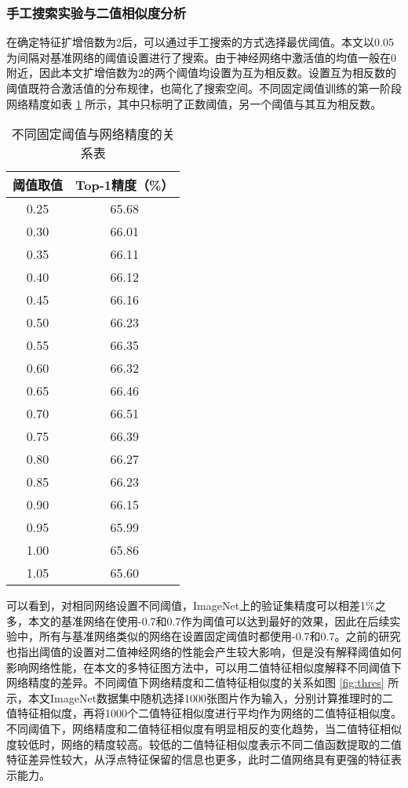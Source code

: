 \subsubsection{手工搜索实验与二值相似度分析}

在确定特征扩增倍数为2后，可以通过手工搜索的方式选择最优阈值。本文以0.05为间隔对基准网络的阈值设置进行了搜索。由于神经网络中激活值的均值一般在0附近，因此本文扩增倍数为2的两个阈值均设置为互为相反数。设置互为相反数的阈值既符合激活值的分布规律，也简化了搜索空间。不同固定阈值训练的第一阶段网络精度如表 \ref{tab:4} 所示，其中只标明了正数阈值，另一个阈值与其互为相反数。

\begin{table}[htb]
  \vspace{6pt}
  \centering
  \caption{不同固定阈值与网络精度的关系表}
  \label{tab:4}
  \begin{tabular}{cc}
    \toprule
    阈值取值   & Top-1精度（\%）    \\
    \midrule
    0.25 & 65.68 \\
    0.30 & 66.01 \\
    0.35 & 66.11 \\
    0.40 & 66.12 \\
    0.45 & 66.16 \\
    0.50 & 66.23 \\
    0.55 & 66.35 \\
    0.60 & 66.32 \\
    0.65 & 66.46 \\
    0.70 & 66.51 \\
    0.75 & 66.39 \\
    0.80 & 66.27 \\
    0.85 & 66.23 \\
    0.90 & 66.15 \\
    0.95 & 65.99 \\
    1.00 & 65.86 \\
    1.05 & 65.60 \\
    \bottomrule
  \end{tabular}
  \vspace{6pt}
\end{table}

可以看到，对相同网络设置不同阈值，ImageNet上的验证集精度可以相差1\%之多，本文的基准网络在使用-0.7和0.7作为阈值可以达到最好的效果，因此在后续实验中，所有与基准网络类似的网络在设置固定阈值时都使用-0.7和0.7。之前的研究\cite{unbalance}也指出阈值的设置对二值神经网络的性能会产生较大影响，但是没有解释阈值如何影响网络性能，在本文的多特征图方法中，可以用二值特征相似度解释不同阈值下网络精度的差异。不同阈值下网络精度和二值特征相似度的关系如图 \ref{fig:thres} 所示，本文ImageNet数据集中随机选择1000张图片作为输入，分别计算推理时的二值特征相似度，再将1000个二值特征相似度进行平均作为网络的二值特征相似度。不同阈值下，网络精度和二值特征相似度有明显相反的变化趋势，当二值特征相似度较低时，网络的精度较高。较低的二值特征相似度表示不同二值函数提取的二值特征差异性较大，从浮点特征保留的信息也更多，此时二值网络具有更强的特征表示能力。

